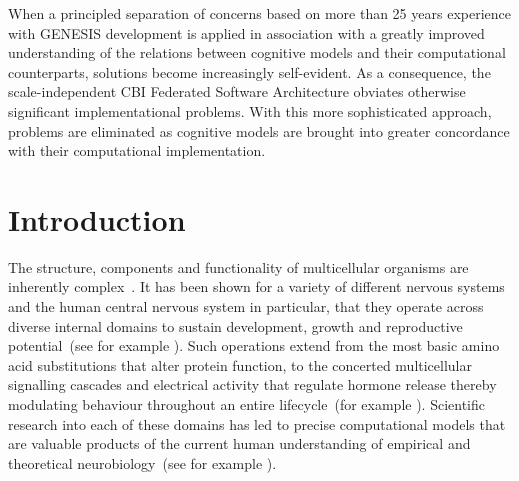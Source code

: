 \documentclass[10pt,letterpaper]{article}
\begin{document}
When a principled separation of concerns based on more than 25 years experience with GENESIS development is applied in association with a greatly improved understanding of the relations between cognitive models and their computational counterparts, solutions become increasingly self-evident. As a consequence, the scale-independent CBI Federated Software Architecture obviates otherwise significant implementational problems. With this more sophisticated approach, problems are eliminated as cognitive models are brought into greater concordance with their computational implementation.


\linenumbers


\section*{Introduction}

The structure, components and functionality of multicellular organisms are inherently complex~\cite{walpole13}. It has been shown for a variety of different nervous systems and the human central nervous system in particular, that they operate across diverse internal domains to sustain development, growth and reproductive potential~(see for example \cite{selverston87,vonk22,kandel21}). Such operations extend from the most basic amino acid substitutions that alter protein function, to the concerted multicellular signalling cascades and electrical activity that regulate hormone release thereby modulating behaviour throughout an entire lifecycle~(for example \cite{ejn17}). Scientific research into each of these domains has led to precise computational models that are valuable products of the current human understanding of empirical and theoretical neurobiology~(see for example \cite{bower13,nandi22}). 
\end{document}
